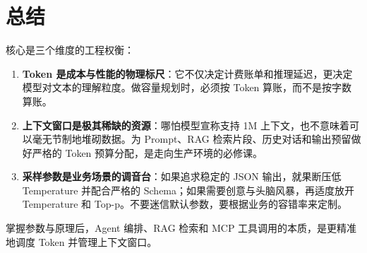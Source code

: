 \documentclass[9pt,a4paper,twocolumn]{ctexart}
\begin{document}
\section*{总结}


核心是三个维度的工程权衡：


\begin{enumerate}[itemsep=1pt, topsep=2pt]
  \item \textbf{Token 是成本与性能的物理标尺}：它不仅决定计费账单和推理延迟，更决定模型对文本的理解粒度。做容量规划时，必须按 Token 算账，而不是按字数算账。
  \item \textbf{上下文窗口是极其稀缺的资源}：哪怕模型宣称支持 1M 上下文，也不意味着可以毫无节制地堆砌数据。为 Prompt、RAG 检索片段、历史对话和输出预留做好严格的 Token 预算分配，是走向生产环境的必修课。
  \item \textbf{采样参数是业务场景的调音台}：如果追求稳定的 JSON 输出，就果断压低 Temperature 并配合严格的 Schema；如果需要创意与头脑风暴，再适度放开 Temperature 和 Top-p。不要迷信默认参数，要根据业务的容错率来定制。
\end{enumerate}


掌握参数与原理后，Agent 编排、RAG 检索和 MCP 工具调用的本质，是更精准地调度 Token 并管理上下文窗口。
\end{document}
